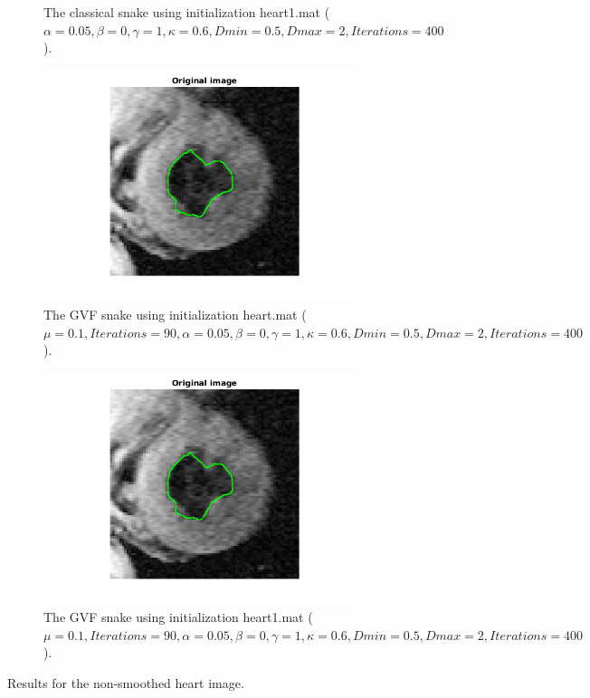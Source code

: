 \documentclass{article}
\begin{document}
\begin{figure}[h!]
\begin{subfigure}{0.49\textwidth}
  \caption{The classical snake using initialization heart1.mat ($\alpha=0.05, \beta=0, \gamma=1,\kappa=0.6,Dmin=0.5,Dmax=2, Iterations=400$).}
  \label{fig6b}
\end{subfigure}
\begin{subfigure}{0.49\textwidth}
  \centering
  \includegraphics[width=\linewidth]{fig6c.png}
  \caption{The GVF snake using initialization heart.mat ($\mu=0.1, Iterations=90, \alpha=0.05, \beta=0, \gamma=1,\kappa=0.6,Dmin=0.5,Dmax=2, Iterations=400$).}
  \label{fig6c}
\end{subfigure}
\begin{subfigure}{0.49\textwidth}
  \centering
  \includegraphics[width=\linewidth]{fig6d.png}
  \caption{The GVF snake using initialization heart1.mat ($\mu=0.1, Iterations=90, \alpha=0.05, \beta=0, \gamma=1,\kappa=0.6,Dmin=0.5,Dmax=2, Iterations=400$).}
  \label{fig6d}
\end{subfigure}
\caption{Results for the non-smoothed heart image.}
\label{fig6}
\end{figure}
\end{document}
